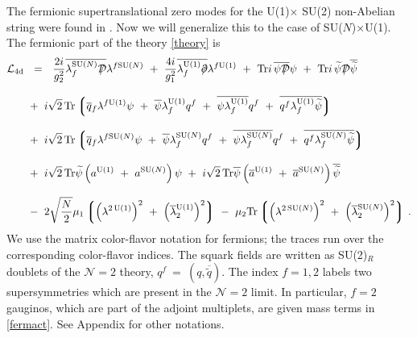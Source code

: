 \documentclass[12pt]{article}
\def\Tr{{\rm Tr}}
\newcommand{\ntwo}{${\mathcal N}=2$ }
\newcommand{\p}{\partial}
\newcommand{\wt}{\widetilde}
\newcommand{\ov}{\overline}
\newcommand{\mc}[1]{\mathcal{#1}}
\newcommand{\md}{\mathcal{D}}
\newcommand{\lgr}{\left\lgroup}
\newcommand{\rgr}{\right\rgroup}
\def\slashed#1{\setbox0=\hbox{$#1$}             %
   \dimen0=\wd0                                 %
   \setbox1=\hbox{/} \dimen1=\wd1               %
   \ifdim\dimen0>\dimen1                        %
      \rlap{\hbox to \dimen0{\hfil/\hfil}}      %
      #1                                        %
   \else                                        %
      \rlap{\hbox to \dimen1{\hfil$#1$\hfil}}   %
      /                                         %
   \fi}                                        %
\newcommand{\aU}{a^{\rm U(1)}}
\newcommand{\aN}{a^\text{SU($N$)}}
\newcommand{\baU}{\ov{a}{}^{\rm U(1)}}
\newcommand{\baN}{\ov{a}{}^\text{SU($N$)}}
\newcommand{\lU}{\lambda^{\rm U(1)}}
\newcommand{\lN}{\lambda^\text{SU($N$)}}
\begin{document}
	The fermionic supertranslational zero modes 
for the U(1)$ \times $ SU(2) non-Abelian string were found in \cite{SYhet}.
	Now we will generalize this to the case of SU($N$)$\times$U(1).
	The fermionic part of the theory \eqref{theory} is
\begin{align}
%
\notag
\mc{L}_{\rm 4d} & ~~=~~ \frac{2i}{g_2^2} \ov{\lN_f \slashed{\md}} \lambda^{f\text{SU($N$)}}
		~+~ \frac{4i}{g_1^2} \ov{\lU_f \slashed{\p}} \lambda^{f{\rm U(1)}}
		~+~ \Tr i\, \ov{\psi \slashed{\md}} \psi  
		~+~ \Tr i\, \wt{\psi} \slashed{\md} \ov{\wt{\psi}}
		\\[3mm]
%
\notag
		& 
		~+~
		i\sqrt{2}\, \Tr \lgr \ov{q}{}_f \lambda^{f{\rm U(1)}}\psi 
				  ~+~ \ov{\psi} \lU_f q^f  
				  ~+~ \ov{\psi \lU_f} q^f
				  ~+~ \ov{q^f \lU_f \wt{\psi}} 
				\rgr
		\\[3mm]
%
\label{fermact}
		&
		~+~
		i\sqrt{2}\, \Tr \lgr \ov{q}{}_f \lambda^{f\text{SU($N$)}} \psi 
					~+~ \ov{\psi} \lN_f q^f
					~+~ \ov{\psi \lN_f} q^f
					~+~ \ov{q^f \lN_f \wt{\psi}}
				\rgr
		\\[3mm]
%
\notag
		&
		~+~
		i\sqrt{2}\, \Tr \wt{\psi} \left( \aU ~+~ \aN \right) \psi  
		~+~ 
		i\sqrt{2}\, \Tr \ov{\psi} \left( \baU ~+~ \baN \right) \ov{\wt{\psi}}
		\\[3mm]
%
\notag
		&
		~-~
		2 \sqrt{\frac{N}{2}} \mu_1 \lgr \left( \lambda^{2\,{\rm U(1)}} \right)^2 
  					    ~+~ \left( \ov{\lambda}{}^{\rm U(1)}_2 \right)^2 \rgr
		~-~
		\mu_2 \Tr \lgr \left( \lambda^{2\,\text{SU($N$)}} \right)^2
			   ~+~ \left( \ov{\lambda}{}^\text{SU($N$)}_2 \right)^2 \rgr\,.
\end{align}
	We use the matrix color-flavor notation for fermions; the traces run
	over the corresponding color-flavor indices.
	The squark fields are written as SU(2)$_R$ doublets of the \ntwo theory,
	$ q^f ~=~ (q, \ov{\wt{q}}) $. 
	The index $ f = 1, 2 $ labels two supersymmetries which are present in the \ntwo limit. 
	In particular, $ f = 2 $ gauginos, which are part of the adjoint multiplets, are given mass terms in \eqref{fermact}.
	See Appendix  for other notations.
	
\end{document}
